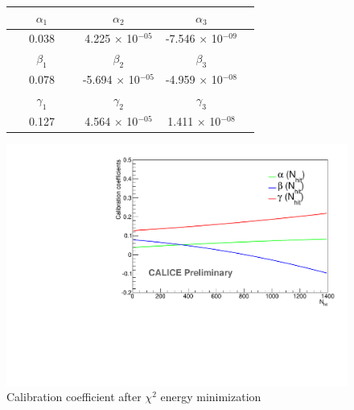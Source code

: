 \documentclass[cits]{JINST}
\begin{document}
\begin{center}
  \begin{figure}
    \begin{minipage}{0.48\textwidth}
      \begin{tabular}{| c | c | c | c |}
        \hline
        $\alpha_1$   &   $\alpha_2$    &   $\alpha_3$   \\ \hline
        ~~~0.038~~~    &   4.225 $\times$ 10$^{-05}$   &   -7.546 $\times$ 10$^{-09}$ \\ \hline \hline
        $\beta_1$    &   $\beta_2$     &   $\beta_3$   \\ \hline
        ~~~0.078~~~ &  -5.694 $\times$ 10$^{-05}$   &   -4.959 $\times$ 10$^{-08}$ \\ \hline \hline
        $\gamma_1$   &   $\gamma_2$    &   $\gamma_3$   \\ \hline
        ~~~0.127~~~  &   4.564 $\times$ 10$^{-05}$   &   1.411 $\times$ 10$^{-08}$  \\ \hline
      \end{tabular}    
    \end{minipage}  \hfill
    \begin{minipage}{0.5\textwidth}
        \includegraphics[width=\linewidth]{plots/EnergyCalibration.pdf}      
    \end{minipage}
    \caption{\label{SDHCAL_CALIBRATION} Calibration coefficient after $\chi^2$ energy minimization}
  \end{figure}
\end{center}
\end{document}
